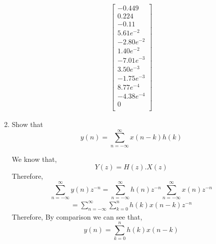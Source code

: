 \documentclass[journal,12pt,twocolumn]{IEEEtran}
\renewcommand\thesection{\arabic{section}}
\begin{document}
\begin{enumerate}[label=\thesection.\arabic*]
\begin{align}
\begin{bmatrix}
 -0.449 \\
  0.224\\
 -0.11 \\
  5.61e^{-2}\\
 -2.80e^{-2} \\ 
 1.40e^{-2} \\
 -7.01e^{-3} \\
 3.50e^{-3}\\
 -1.75e^{-3} \\ 
 8.77e^{-4} \\
 -4.38e^{-4} \\
 0\\
\end{bmatrix}
\end{align}
\item Show that
\begin{equation}
y(n) =  \sum_{n=-\infty}^{\infty}x(n-k)h(k)
\end{equation}

\solution We know that,
\begin{equation}
Y(z) = H(z).X(z)
\end{equation}
Therefore,
\begin{equation}
\sum_{n=-\infty}^{\infty}y(n)z^{-n} = \sum_{n=-\infty}^{\infty}h(n)z^{-n}\sum_{n=-\infty}^{\infty}x(n)z^{-n}
\end{equation}
\begin{align}
=\sum_{n=-\infty}^{\infty}\sum_{k=0}^{n}h(k)x(n-k)z^{-n}
\end{align}
Therefore, By comparison we can see that,
\begin{equation}
y(n) = \sum_{k=0}^{n}h(k)x(n-k)
\end{equation}
\end{enumerate}   
\end{document}
